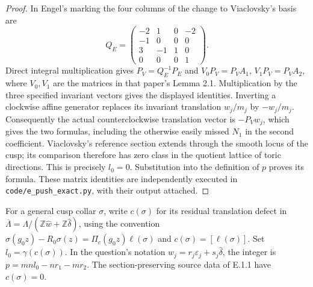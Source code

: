 \begin{proof}
In Engel's marking the four columns of the change to Viaclovsky's
basis are
\[
 Q_E=\begin{pmatrix}-2&1&0&-2\\-1&0&0&0\\3&-1&1&0\\0&0&0&1\end{pmatrix}.
\]
Direct integral multiplication gives $P_V=Q_E^{-1}P_E$ and
$V_0P_V=P_VA_1$, $V_1P_V=P_VA_2$, where $V_0,V_1$ are the
matrices in that paper's Lemma 2.1.  Multiplication by the three
specified invariant vectors gives the displayed identities.
Inverting a clockwise affine generator replaces its invariant
translation $w_j/m_j$ by $-w_j/m_j$.  Consequently the actual
counterclockwise translation vector is $-P_Vw_j$, which gives the
two formulas, including the otherwise easily missed $N_1$ in the
second coefficient.  Viaclovsky's reference section extends through
the smooth locus of the cusp; its comparison therefore has zero
class in the quotient lattice of toric directions.  This is precisely
$l_0=0$.  Substitution into the definition of $p$ proves its formula.
These matrix identities are independently executed in
\texttt{code/e\_push\_exact.py}, with their output attached.
\end{proof}

For a general cusp collar $\sigma$, write $c(\sigma)$ for
its residual translation defect in
$\overline\Lambda=\Lambda/(\mathbb Z\widehat w+
\mathbb Z\widehat\delta)$, using the convention
$\sigma(g_0z)-R_0\sigma(z)=\Pi_c(g_0z)\ell(\sigma)$
and $c(\sigma)=[\ell(\sigma)]$.
Set $l_0=\gamma(c(\sigma))$.  In the question's notation
$w_j=r_j\varepsilon_j+s_j\widehat\delta$, the integer is
$p=mn l_0-nr_1-mr_2$.
The section-preserving source data of E.1.1 have $c(\sigma)=0$.

